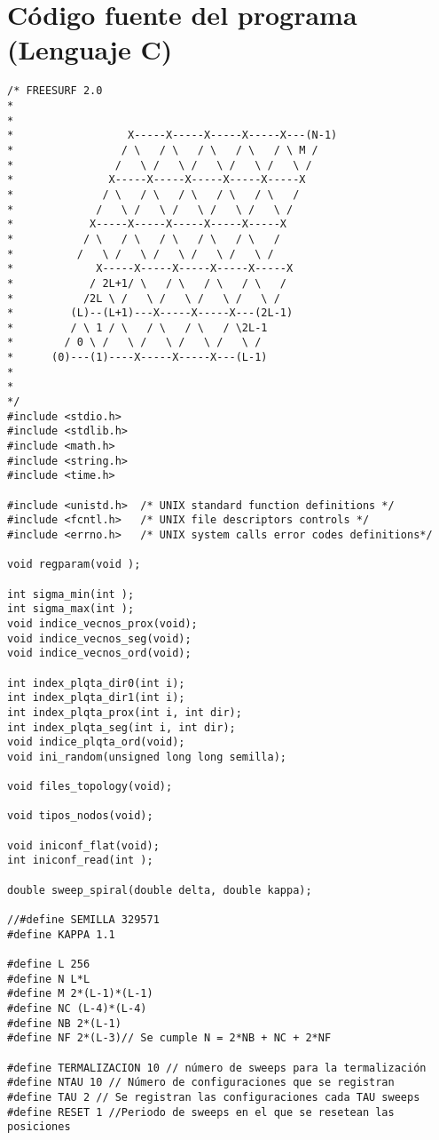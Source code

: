 \appendix
\chapter{Código fuente del programa (Lenguaje C)}
\begin{verbatim}
/* FREESURF 2.0
*
*
* 		           X-----X-----X-----X-----X---(N-1)
* 		          / \   / \   /	\   / \   / \ M /
* 		         /   \ /   \ /	 \ /   \ /   \ /
* 		        X-----X-----X-----X-----X-----X
* 		       / \   / \   / \	 / \   / \   /
* 		      /   \ /   \ /   \ /   \ /   \ /
* 		     X-----X-----X-----X-----X-----X
*		    / \	  / \   / \   / \   / \   /
*		   /   \ /   \ /   \ /   \ /   \ /
*	          X-----X-----X-----X-----X-----X
*	         / 2L+1/ \   / \   / \	 / \   /
*	        /2L \ /   \ /   \ /   \	/   \ /
*	      (L)--(L+1)---X-----X-----X---(2L-1)
*	      / \ 1 / \	  / \   / \   / \2L-1
*	     / 0 \ /   \ /   \ /   \ /	 \ /
*	   (0)---(1)----X-----X-----X---(L-1)
*
*
*/
#include <stdio.h>
#include <stdlib.h>
#include <math.h>
#include <string.h>
#include <time.h>

#include <unistd.h>  /* UNIX standard function definitions */
#include <fcntl.h>   /* UNIX file descriptors controls */
#include <errno.h>   /* UNIX system calls error codes definitions*/

void regparam(void );

int sigma_min(int );
int sigma_max(int );
void indice_vecnos_prox(void);
void indice_vecnos_seg(void);
void indice_vecnos_ord(void);

int index_plqta_dir0(int i);
int index_plqta_dir1(int i);
int index_plqta_prox(int i, int dir);
int index_plqta_seg(int i, int dir);
void indice_plqta_ord(void);
void ini_random(unsigned long long semilla);

void files_topology(void);

void tipos_nodos(void);

void iniconf_flat(void);
int iniconf_read(int );

double sweep_spiral(double delta, double kappa);

//#define SEMILLA 329571
#define KAPPA 1.1

#define L 256
#define N L*L
#define M 2*(L-1)*(L-1)
#define NC (L-4)*(L-4)
#define NB 2*(L-1)
#define NF 2*(L-3)// Se cumple N = 2*NB + NC + 2*NF

#define TERMALIZACION 10 // número de sweeps para la termalización
#define NTAU 10 // Número de configuraciones que se registran
#define TAU 2 // Se registran las configuraciones cada TAU sweeps 
#define RESET 1 //Periodo de sweeps en el que se resetean las posiciones 


\end{verbatim}
